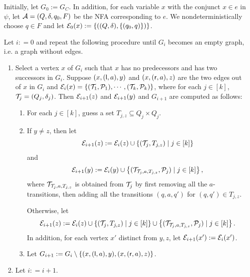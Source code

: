 
Initially, let $G_0:= G_C$.  In addition, for each variable $x$ with the conjunct $x \in e$ in $\psi$, let $\mathcal{A}=(Q, \delta, q_0, F)$ be the NFA corresponding to $e$. We nondeterministically choose $q \in F$ and let $\mathcal{E}_0(x):=  \{((Q, \delta), \{(q_0, q)\})\}$.


% 

Let $i: = 0$ and repeat the following procedure until $G_i$ becomes an empty graph, i.e. a graph without edges. 
\begin{enumerate}
\item Select a vertex $x$ of $G_i$ such that $x$ has no predecessors  and has two successors in $G_i$. Suppose $(x, (\mathsf{l}, a), y)$ and $(x, (\mathsf{r},a), z)$ are the two edges out of $x$ in $G_i$ and $\mathcal{E}_i(x)=\{(\mathcal{T}_1,\mathcal{P}_1), \cdots, (\mathcal{T}_k, \mathcal{P}_k)\}$, where for each $j \in [k]$, $\mathcal{T}_j = (Q_j, \delta_j)$. Then $\mathcal{E}_{i+1}(z)$ and  $\mathcal{E}_{i+1}(y)$ and $G_{i+1}$ are computed as follows:  
\begin{enumerate}
\item For each $j \in [k]$, guess a set $T_{j, z} \subseteq Q_j \times Q_j$.
%
\item If $y \neq z$, then let 
$$\mathcal{E}_{i+1}(z):= \mathcal{E}_{i}(z) \cup \left\{(\mathcal{T}_j, T_{j,z}) \mid j \in [k] \right\}$$
and 
$$\mathcal{E}_{i+1}(y): = \mathcal{E}_{i}(y) \cup \left\{(\mathcal{T}_{\mathcal{T}_j, a, T_{j,z}}, \mathcal{P}_j) \mid j \in [k] \right\},$$
where $\mathcal{T}_{\mathcal{T}_j, a, T_{j,z}}$ is obtained from $\mathcal{T}_j$ by first removing all the $a$-transitions, then adding all the transitions $(q, a, q')$ for $(q,q') \in T_{j,z}$. 

Otherwise, let
$$\mathcal{E}_{i+1}(z):= \mathcal{E}_{i}(z) \cup \left\{(\mathcal{T}_j, T_{j,z}) \mid j \in [k] \right\} \cup \left\{(\mathcal{T}_{\mathcal{T}_j, a, T_{j,z}}, \mathcal{P}_j) \mid j \in [k] \right\}.$$
In addition, for each vertex $x'$ distinct from $y, z$, let $\mathcal{E}_{i+1}(x') := \mathcal{E}_i(x')$.
%
\item Let $G_{i+1}:= G_i \setminus \{(x, (\mathsf{l}, a), y), (x, (\mathsf{r},a), z)\}$.
\end{enumerate}
%
\item Let $i: = i+1$.
\end{enumerate}

